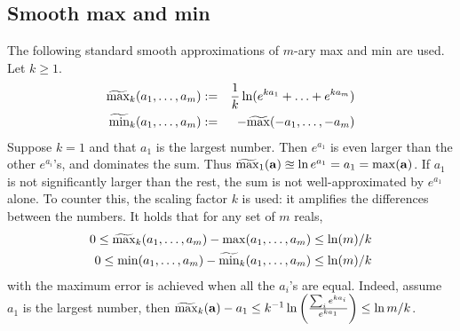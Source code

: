 \subsection{Smooth max and min}
\label{max min smoothing}
The following standard smooth approximations of $m$-ary max and min are used.
Let $k \geq 1$.
\begin{eqnarray}
	\label{eq:soft max min}
	\widetilde{\max}_k(a_1,\ldots,a_m) &:=& \frac{1}{k} \ln(e^{ka_1}+\ldots+e^{ka_m})
	\\
	\widetilde{\min}_k(a_1,\ldots,a_m) &:=& -\widetilde{\max}(-a_1,\ldots,-a_m)
\end{eqnarray}
Suppose $k=1$ and that $a_1$ is the largest number.
Then $e^{a_1}$ is even larger than the other $e^{a_i}$'s, and dominates the sum. 
Thus $\widetilde{\max}_1(\mathbf{a}) \approxeq \ln e^{a_1} = a_1 = \max(\mathbf{a})$.
If $a_1$ is not significantly larger than the rest, the sum is not well-approximated by $e^{a_1}$ alone.
To counter this, the scaling factor $k$ is used: it amplifies the differences between the numbers.
It holds that for any set of $m$ reals,
\begin{eqnarray}
\label{eq:smooth max error}
0 \leq \widetilde{\max}_k(a_1,\ldots,a_m) -\max(a_1,\ldots,a_m) \leq \ln(m)/k
\\
0 \leq \min(a_1,\ldots,a_m) -\widetilde{\min}_k(a_1,\ldots,a_m) \leq \ln(m)/k
\end{eqnarray}
with the maximum error is achieved when all the $a_i$'s are equal.
Indeed, assume $a_1$ is the largest number, then 
$\widetilde{\max}_k(\mathbf{a}) - a_1 \leq k^{-1}\ln\left(\frac{\sum_ie^{ka_i}}{e^{ka_1}}\right) \leq \ln m /k$.

